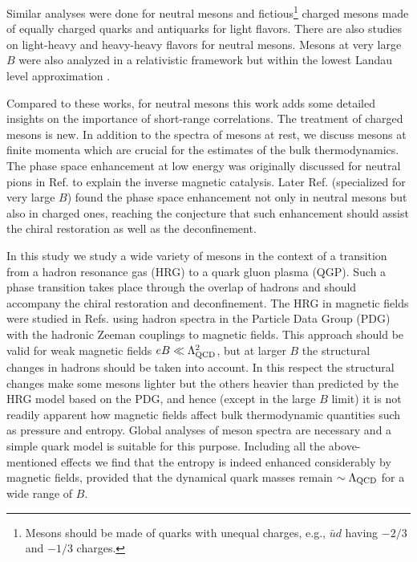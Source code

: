 Similar analyses were done for neutral mesons \cite{Simonov:2012if} and fictious\footnote{Mesons should be made of quarks with unequal charges, e.g., $\bar{u}d$ having $-2/3$ and $-1/3$ charges.} charged mesons made of equally charged quarks and antiquarks \cite{Orlovsky:2013gha} for light flavors. There are also studies on light-heavy \cite{Yoshida:2016xgm} and heavy-heavy flavors \cite{Yoshida:2016xgm,Alford:2013jva} for neutral mesons. Mesons at very large $B$ were also analyzed in a relativistic framework but within the lowest Landau level approximation  \cite{Kojo:2012js,Hattori:2015aki}.

Compared to these works, for neutral mesons this work adds some detailed insights on the importance of short-range correlations. 
The treatment of charged mesons is new. In addition to the spectra of mesons at rest, we discuss mesons at finite momenta which are crucial for the estimates of the bulk thermodynamics. 
The phase space enhancement at low energy was originally discussed for neutral pions in Ref.\cite{Fukushima:2012kc} to explain the inverse magnetic catalysis. 
Later Ref.\cite{Hattori:2015aki} (specialized for very large $B$) found the phase space enhancement not only in neutral mesons but also in charged ones, 
reaching the conjecture that such enhancement should assist the chiral restoration as well as the deconfinement. 

In this study we study a wide variety of mesons in the context of a transition from a hadron resonance gas (HRG) to a quark gluon plasma (QGP). 
Such a phase transition takes place through the overlap of hadrons and should accompany the chiral restoration and deconfinement. 
The HRG in magnetic fields were studied in Refs.\cite{Endrodi:2013cs,Fukushima:2016vix} using hadron spectra in the Particle Data Group (PDG) \cite{ParticleDataGroup:2020ssz}
 with the hadronic Zeeman couplings to magnetic fields. 
This approach should be valid for weak magnetic fields $eB \ll \Lambda_{\rm QCD}^2$, but at larger $B$ the structural changes in hadrons should be taken into account.
In this respect the structural changes make some mesons lighter but the others heavier than predicted by the HRG model based on the PDG, 
and hence (except in the large $B$ limit) it is not readily apparent how magnetic fields affect bulk thermodynamic quantities such as pressure and entropy. 
Global analyses of meson spectra are necessary and a simple quark model is suitable for this purpose. 
Including all the above-mentioned effects we find that the entropy is indeed enhanced considerably by magnetic fields, provided that the dynamical quark masses remain $\sim \Lambda_{\rm QCD}$ for a wide range of $B$.

